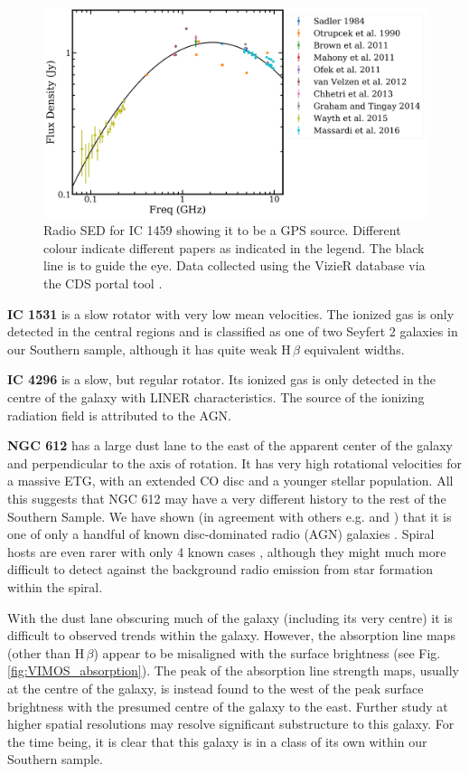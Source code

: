 \begin{figure}
	\centering
	\includegraphics[height=0.4\textwidth]{appendix/appendix2/ic1459.png}
	\caption[Radio SED for IC 1459]{Radio SED for IC 1459 showing it to be a GPS source. Different colour indicate different papers as indicated in the legend. The black line is to guide the eye. Data collected using the VizieR database via the CDS portal tool \citep{Ochsenbein2000}.} 
	\label{fig:ic1459radio}
\end{figure}
\nocite{Brown2011, Massardi2016, Ofek2011, Wayth2015, Mahony2011, Otrupcek1990, Graham2014, Chhetri2013, VanVelzen2012, Sadler1984}

\textbf{IC 1531} is a slow rotator with very low mean velocities. The ionized gas is only detected in the central regions and is classified as one of two Seyfert 2 galaxies in our Southern sample, although it has quite weak H\,$\beta$ equivalent widths. 

\textbf{IC 4296} is a slow, but regular rotator. Its ionized gas is only detected in the centre of the galaxy with LINER characteristics. The source of the ionizing radiation field is attributed to the AGN. 

\textbf{NGC 612} has a large dust lane to the east of the apparent center of the galaxy and perpendicular to the axis of rotation. It has very high rotational velocities for a massive ETG, with an extended CO disc and a younger stellar population. All this suggests that NGC 612 may have a very different history to the rest of the Southern Sample. We have shown (in agreement with others e.g. \citealt{Ledlow1998} and \citealt{Emonts2009}) that it is one of only a handful of known disc-dominated radio (AGN) galaxies \citep[e.g.][]{Morganti2011}. Spiral hosts are even rarer with only 4 known cases \citep{Ledlow1998, Hota2011a, Bagchi2014, Mao2015}, although they might much more difficult to detect against the background radio emission from star formation within the spiral.

With the dust lane obscuring much of the galaxy (including its very centre) it is difficult to observed trends within the galaxy. However, the absorption line maps (other than H\,$\beta$) appear to be misaligned with the surface brightness (see Fig.\,\ref{fig:VIMOS_absorption}). The peak of the absorption line strength maps, usually at the centre of the galaxy, is instead found to the west of the peak surface brightness with the presumed centre of the galaxy to the east. Further study at higher spatial resolutions may resolve significant substructure to this galaxy. For the time being, it is clear that this galaxy is in a class of its own within our Southern sample. 

